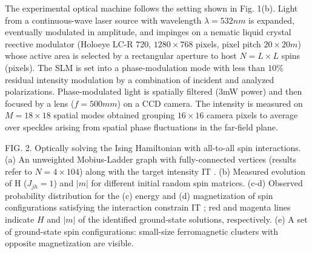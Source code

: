 The experimental optical machine follows the setting shown in Fig. 1(b). Light from a continuous-wave laser source with wavelength $\lambda = 532nm$ is expanded, eventually modulated in amplitude, and impinges on a nematic liquid crystal reective modulator (Holoeye LC-R 720, $1280 \times 768$ pixels, pixel pitch $20 \times 20m$) whose active area is selected by a rectangular aperture to host $N = L \times L$ spins (pixels). The SLM is set into a phase-modulation mode with less than $10\%$ residual intensity modulation by a combination of incident and analyzed polarizations. Phase-modulated light is spatially filtered (3mW power) and then focused by a lens ($f= 500mm$) on a CCD camera. The intensity is measured on $M = 18 \times 18$ spatial modes obtained grouping $16 \times 16$ camera pixels to average over speckles arising from spatial phase fluctuations in the far-field plane.

FIG. 2. Optically solving the Ising Hamiltonian with all-to-all spin interactions. (a) An unweighted Mobius-Ladder graph
with fully-connected vertices (results refer to $N = 4 \times 104$) along with the target intensity IT . (b) Measured evolution of H ($J_{jh} = 1$) and $|m|$ for different initial random spin matrices. (c-d) Observed probability distribution for the (c) energy and (d) magnetization of spin configurations satisfying the interaction constrain IT ; red and magenta lines indicate $H$ and $|m|$ of the identified ground-state solutions, respectively. (e) A set of ground-state spin configurations: small-size ferromagnetic clusters with opposite magnetization are visible.

